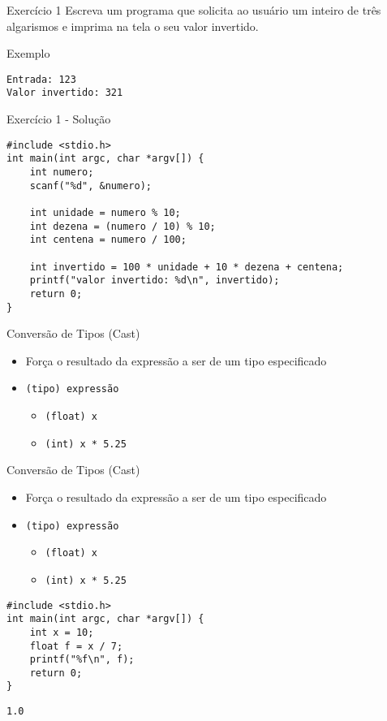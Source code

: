 \documentclass[t, aspectratio=169]{beamer}
\begin{document}
\begin{frame}[label={sec:org42e6128},fragile]{Exercício 1}
 Escreva um programa que solicita ao usuário um inteiro de três
algarismos e imprima na tela o seu valor invertido.

\vspace{0.5cm}
\alert{Exemplo}
\begin{verbatim}
Entrada: 123
Valor invertido: 321
\end{verbatim}
\end{frame}

\begin{frame}[label={sec:org79aa5d0},fragile]{Exercício 1 - Solução}
 \vspace{-0.5cm}
\begin{verbatim}
#include <stdio.h>
int main(int argc, char *argv[]) {
    int numero;
    scanf("%d", &numero);

    int unidade = numero % 10;
    int dezena = (numero / 10) % 10;
    int centena = numero / 100;

    int invertido = 100 * unidade + 10 * dezena + centena;
    printf("valor invertido: %d\n", invertido);
    return 0;
}
\end{verbatim}
\end{frame}

\begin{frame}[label={sec:orgdbb734c},fragile]{Conversão de Tipos (Cast)}
 \begin{itemize}
\item Força o resultado da expressão a ser de um tipo especificado
\item \texttt{(tipo) expressão}
\begin{itemize}
\item \texttt{(float) x}
\item \texttt{(int) x * 5.25}
\end{itemize}
\end{itemize}
\end{frame}

\begin{frame}[label={sec:orgb953ce2},fragile]{Conversão de Tipos (Cast)}
 \begin{itemize}
\item Força o resultado da expressão a ser de um tipo especificado
\item \texttt{(tipo) expressão}
\begin{itemize}
\item \texttt{(float) x}
\item \texttt{(int) x * 5.25}
\end{itemize}
\end{itemize}

\vspace{-0.25cm}
\begin{verbatim}
#include <stdio.h>
int main(int argc, char *argv[]) {
    int x = 10;
    float f = x / 7;
    printf("%f\n", f);
    return 0;
}
\end{verbatim}

\begin{verbatim}
1.0
\end{verbatim}
\end{frame}
\end{document}
